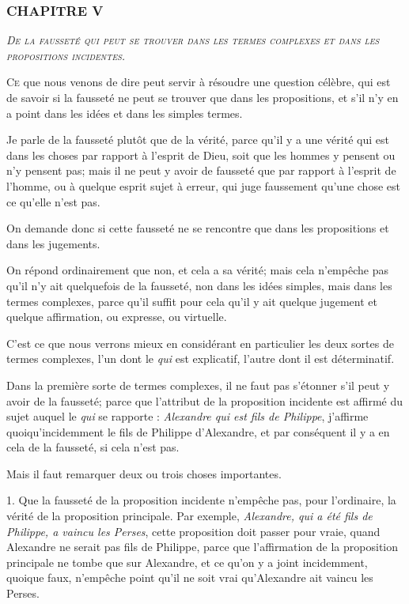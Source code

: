 \subsubsection{\centering \Large CHAPITRE V}
\begin{center}\emph{\large\scshape De la fausseté qui peut se trouver dans les termes complexes et dans les propositions incidentes.}\end{center}

	\lettrine{C}{e} que nous venons de dire peut servir à résoudre une question célèbre, qui est de savoir si la fausseté ne peut se trouver que dans les propositions, et s'il n'y en a point dans les idées et dans les simples termes.

Je parle de la fausseté plutôt que de la vérité, parce qu'il y a une vérité qui est dans les choses par rapport à l'esprit de Dieu, soit que les hommes y pensent ou n'y pensent pas; mais il ne peut y avoir de fausseté que par rapport à l'esprit de l'homme, ou à quelque esprit sujet à erreur, qui juge faussement qu'une chose est ce qu'elle n'est pas.

On demande donc si cette fausseté ne se rencontre que dans les propositions et dans les jugements.

On répond ordinairement que non, et cela a sa vérité; mais cela n'empêche pas qu'il n'y ait quelquefois de la fausseté, non dans les idées simples, mais dans les termes complexes, parce qu'il suffit pour cela qu'il y ait quelque jugement et quelque affirmation, ou expresse, ou virtuelle.

C'est ce que nous verrons mieux en considérant en particulier les deux sortes de termes complexes, l'un dont le \emph{qui} est explicatif, l'autre dont il est déterminatif.

Dans la première sorte de termes complexes, il ne faut pas s'étonner s'il peut y avoir de la fausseté; parce que l'attribut de la proposition incidente est affirmé du sujet auquel le \emph{qui} se rapporte : \emph{Alexandre qui est fils de Philippe}, j'affirme quoiqu'incidemment le fils de Philippe d'Alexandre, et par conséquent il y a en cela de la fausseté, si cela n'est pas.

Mais il faut remarquer deux ou trois choses importantes.

\bigbreak
{1.} Que la fausseté de la proposition incidente n'empêche pas, pour l'ordinaire, la vérité de la proposition principale. Par exemple, \emph{Alexandre, qui a été fils de Philippe, a vaincu les Perses}, cette proposition doit passer pour vraie, quand Alexandre ne serait pas fils de Philippe, parce que l'affirmation de la proposition principale ne tombe que sur Alexandre, et ce qu'on y a joint incidemment, quoique faux, n'empêche point qu'il ne soit vrai qu'Alexandre ait vaincu les Perses.

